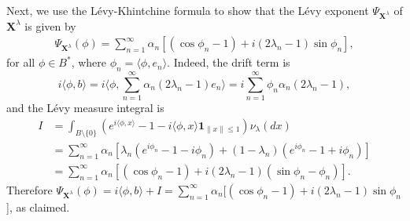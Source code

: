 \documentclass[11pt]{amsart}
\theoremstyle{definition}
\theoremstyle{remark}
\numberwithin{equation}{section}
\begin{document}
Next, we use the L\'evy-Khintchine formula to show that the L\'evy exponent  \( \Psi_{\bm{X}^\lambda}\) of \(\bm{X}^\lambda\) is given by \begin{align}\label{LK}\Psi_{\bm{X}^\lambda}(\phi)=\sum_{n=1}^\infty\alpha_n[(\cos \phi_n-1)+i(2\lambda_n-1)\sin \phi_n],\end{align} for all \(\phi\in B^*\), where \(\phi_n=  \langle  \phi, e_n \rangle\). Indeed, the drift term is\[ i \langle  \phi, b \rangle=i\langle  \phi, \sum_{n=1}^\infty\alpha_n(2\lambda_n-1)e_n \rangle=i\sum_{n=1}^\infty\phi_n\alpha_n(2\lambda_n-1),\] and the L\'evy measure integral is \begin{align*}
I&=\int_{B \setminus \{0\}} \left(e^{i \langle \phi, x \rangle} - 1 - i \langle \phi, x \rangle \mathbf{1}_{\|x\| \leq 1}\right) \nu_\lambda(dx)\\&=
\sum_{n=1}^\infty \alpha_n\left[\lambda_n(e^{i\phi_n}-1-i\phi_n)+(1-\lambda_n)(e^{i\phi_n}-1+i\phi_n) \right]\\&=
\sum_{n=1}^\infty \alpha_n\left[(\cos \phi_n-1)+i(2\lambda_n-1)(\sin \phi_n-\phi_n) \right].
\end{align*} Therefore \(\Psi_{\bm{X}^\lambda}(\phi)=i \langle  \phi, b \rangle+I=\sum_{n=1}^\infty\alpha_n[(\cos \phi_n-1)+i(2\lambda_n-1)\sin \phi_n\)], as claimed. 
\end{document}
